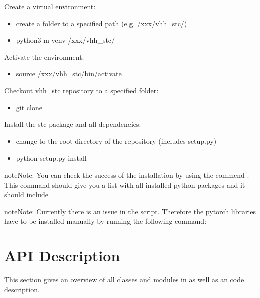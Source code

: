 \documentclass[letterpaper,10pt,english]{sphinxmanual}
\begin{document}
Create a virtual environment:
\begin{itemize}
\item {} 
create a folder to a specified path (e.g. /xxx/vhh\_stc/)

\item {} 
python3 \sphinxhyphen{}m venv /xxx/vhh\_stc/

\end{itemize}

Activate the environment:
\begin{itemize}
\item {} 
source /xxx/vhh\_stc/bin/activate

\end{itemize}

Checkout vhh\_stc repository to a specified folder:
\begin{itemize}
\item {} 
git clone 

\end{itemize}

Install the stc package and all dependencies:
\begin{itemize}
\item {} 
change to the root directory of the repository (includes setup.py)

\item {} 
python setup.py install

\end{itemize}

\begin{sphinxadmonition}{note}{Note:}
You can check the success of the installation by using the commend . This command should give you a list with all installed python packages and it should include 
\end{sphinxadmonition}

\begin{sphinxadmonition}{note}{Note:}
Currently there is an issue in the  script. Therefore the pytorch libraries have to be installed manually by running the following command:
\end{sphinxadmonition}


\chapter{API Description}
\label{\detokenize{index:api-description}}
This section gives an overview of all classes and modules in  as well as an code description.
\end{document}
